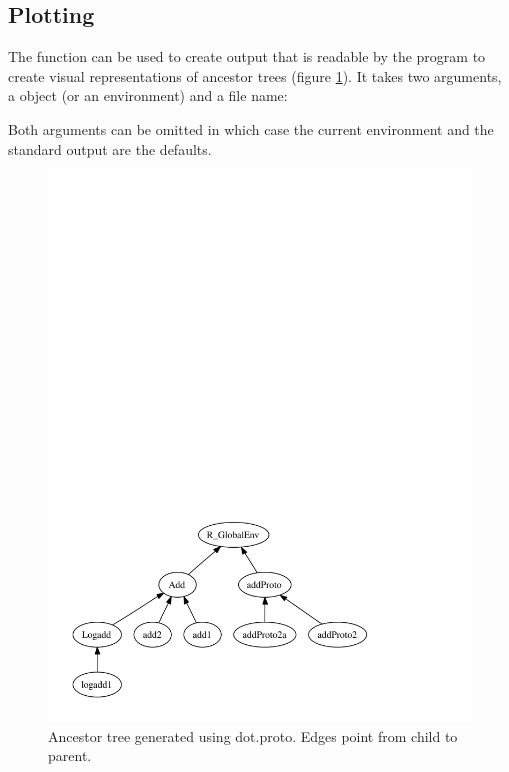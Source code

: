 \documentclass{Z}
\begin{document}
\subsection{Plotting}
\label{sec:plot}

The  function can be used to create output that is
readable by the   program \citep{Ganser+North:1999}
to create visual representations of ancestor trees (figure
\ref{fig:proto-dot}).  It takes two arguments, a  object
(or an environment) and a file name:




Both arguments can be omitted in which case the current environment
and the standard output are the defaults.

\begin{figure}[tbp]
\begin{center}
\includegraphics{test.pdf}
\caption{\label{fig:proto-dot} Ancestor tree generated using dot.proto. Edges
point from child to parent.}
\end{center}
\end{figure}
\end{document}

